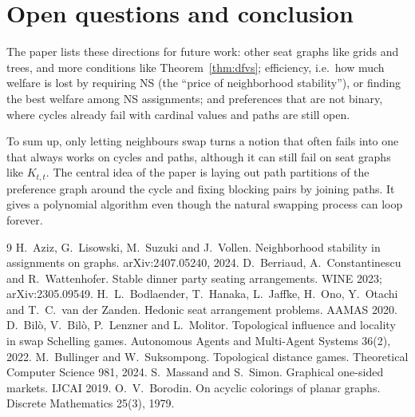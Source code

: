 \documentclass[11pt,a4paper]{article}
\theoremstyle{definition}
\theoremstyle{remark}
\theoremstyle{plain}
\begin{document}
\section{Open questions and conclusion}

The paper lists these directions for future work: other seat graphs like grids and trees, and more conditions like Theorem~\ref{thm:dfvs}; efficiency, i.e.\ how much welfare is lost by requiring NS (the ``price of neighborhood stability''), or finding the best welfare among NS assignments; and preferences that are not binary, where cycles already fail with cardinal values and paths are still open.

To sum up, only letting neighbours swap turns a notion that often fails into one that always works on cycles and paths, although it can still fail on seat graphs like $K_{t,t}$. The central idea of the paper is laying out path partitions of the preference graph around the cycle and fixing blocking pairs by joining paths. It gives a polynomial algorithm even though the natural swapping process can loop forever.

\begin{thebibliography}{9}\small
{} H.~Aziz, G.~Lisowski, M.~Suzuki and J.~Vollen. Neighborhood stability in assignments on graphs. arXiv:2407.05240, 2024.
 D.~Berriaud, A.~Constantinescu and R.~Wattenhofer. Stable dinner party seating arrangements. WINE 2023; arXiv:2305.09549.
 H.~L.~Bodlaender, T.~Hanaka, L.~Jaffke, H.~Ono, Y.~Otachi and T.~C.~van der Zanden. Hedonic seat arrangement problems. AAMAS 2020.
 D.~Bil\`o, V.~Bil\`o, P.~Lenzner and L.~Molitor. Topological influence and locality in swap Schelling games. Autonomous Agents and Multi-Agent Systems 36(2), 2022.
 M.~Bullinger and W.~Suksompong. Topological distance games. Theoretical Computer Science 981, 2024.
 S.~Massand and S.~Simon. Graphical one-sided markets. IJCAI 2019.
 O.~V.~Borodin. On acyclic colorings of planar graphs. Discrete Mathematics 25(3), 1979.
\end{thebibliography}
\end{document}
